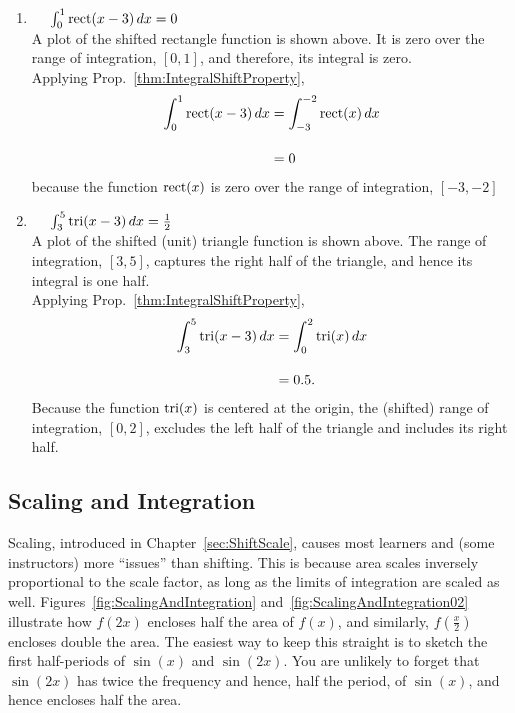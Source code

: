 \begin{enumerate}
     \item \Ans ~~ $\int_0^1 \mathrm{rect}(x-3)\, dx = 0$ \\

     A plot of the shifted rectangle function is shown above. It is zero over the range of integration, $[0, 1]$, and therefore, its integral is zero.\\

Applying Prop.~\ref{thm:IntegralShiftProperty}, 
\begin{align*}
    \int_0^1 \mathrm{rect}(x-3)\, dx &=   \int_{-3}^{-2} \mathrm{rect}(x)\, dx \\[1em]
    & = 0
\end{align*}
because the function ${\rm rect}(x)$ is zero over the range of integration, $[-3, -2]$

     \item \Ans~~ $\int_3^5 \mathrm{tri}(x-3)\, dx = \frac{1}{2}$\\

        A plot of the shifted (unit) triangle function is shown above. The range of integration, $[3, 5]$, captures the right half of the triangle, and hence its integral is one half.\\

        Applying Prop.~\ref{thm:IntegralShiftProperty}, 
\begin{align*}
    \int_3^5 \mathrm{tri}(x-3)\, dx &=   \int_{0}^{2} \mathrm{tri}(x)\, dx \\[1em]
    & = 0.5.
\end{align*}
Because the function ${\rm tri}(x)$ is centered at the origin, the (shifted) range of integration, $[0, 2]$, excludes the left half of the triangle and includes its right half.
\end{enumerate}


\Qed


\subsection{Scaling and Integration}

Scaling, introduced in Chapter~\ref{sec:ShiftScale}, causes most learners and (some instructors) more ``issues'' than shifting. This is because area scales inversely proportional to the scale factor, as long as the limits of integration are scaled as well. Figures~\ref{fig:ScalingAndIntegration} and~\ref{fig:ScalingAndIntegration02} illustrate how $f(2x)$ encloses half the area of $f(x)$, and similarly, $f(\frac{x}{2})$ encloses double the area. The easiest way to keep this straight is to sketch the first half-periods of $\sin(x)$ and $\sin(2x)$. You are unlikely to forget that $\sin(2x)$ has twice the frequency and hence, half the period, of $\sin(x)$, and hence encloses half the area.\\

